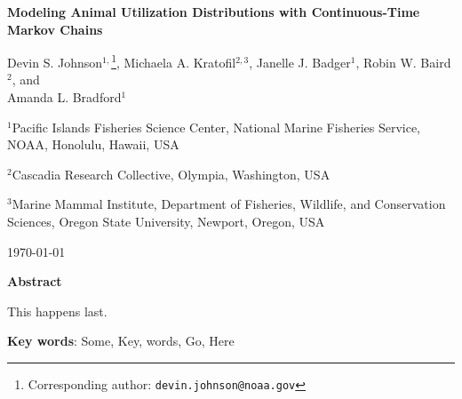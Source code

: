 \documentclass[12pt]{article}
\begin{document}

\vspace*{1.25in}

\setlength{\parindent}{0pt}
\renewcommand{\baselinestretch}{1.8}\normalsize

{\Large \bf Modeling Animal Utilization Distributions with Continuous-Time Markov Chains}


\renewcommand{\baselinestretch}{1.15}\normalsize 
\bigskip\bigskip\bigskip

{Devin S. Johnson}$^{1,}$\footnote{Corresponding author: {\tt devin.johnson@noaa.gov}}, Michaela A. Kratofil$^{2,3}$, Janelle J. Badger$^1$, Robin W. Baird$^2$, and \\ Amanda L. Bradford$^1$ \bigskip

$^1$Pacific Islands Fisheries Science Center, National Marine Fisheries Service, NOAA, Honolulu, Hawaii, USA 

$^2$Cascadia Research Collective, Olympia, Washington, USA

$^3$Marine Mammal Institute, Department of Fisheries, Wildlife, and Conservation Sciences, Oregon State University, Newport, Oregon, USA

\bigskip

\today


\vspace*{\fill}

\clearpage




\linenumbers


\vspace*{0.25\textheight}
\begin{center}
\begin{minipage}{0.65\paperwidth}
\renewcommand{\baselinestretch}{1}\normalsize

\centerline{\bf Abstract} 
This happens last. \bigskip

{\bf Key words}: Some, Key, words, Go, Here
\end{minipage}
\end{center}

\clearpage
\end{document}
